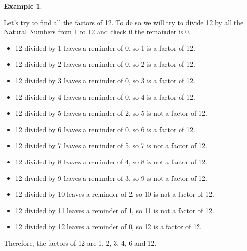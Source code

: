 \documentclass[11pt, oneside]{article}
\theoremstyle{definition}
\newtheorem{exmp}{Example}[section]
\begin{document}
\begin{exmp} \end{exmp}
Let's try to find all the factors of 12. To do so we will try to divide 12 by all the Natural Numbers from 1 to 12 and check if the remainder is 0.
\begin{itemize}
\item 12 divided by 1 leaves a reminder of 0, so 1 is a factor of 12.
\item 12 divided by 2 leaves a reminder of 0, so 2 is a factor of 12.
\item 12 divided by 3 leaves a reminder of 0, so 3 is a factor of 12.
\item 12 divided by 4 leaves a reminder of 0, so 4 is a factor of 12.
\item 12 divided by 5 leaves a reminder of 2, so 5 is not a factor of 12.
\item 12 divided by 6 leaves a reminder of 0, so 6 is a factor of 12.
\item 12 divided by 7 leaves a reminder of 5, so 7 is not a factor of 12.
\item 12 divided by 8 leaves a reminder of 4, so 8 is not a factor of 12.
\item 12 divided by 9 leaves a reminder of 3, so 9 is not a factor of 12.
\item 12 divided by 10 leaves a reminder of 2, so 10 is not a factor of 12.
\item 12 divided by 11 leaves a reminder of 1, so 11 is not a factor of 12.
\item 12 divided by 12 leaves a reminder of 0, so 12 is a factor of 12.
\end{itemize}
Therefore, the factors of 12 are 1, 2, 3, 4, 6 and 12.

\bigbreak

\noindent{}
\end{document}
